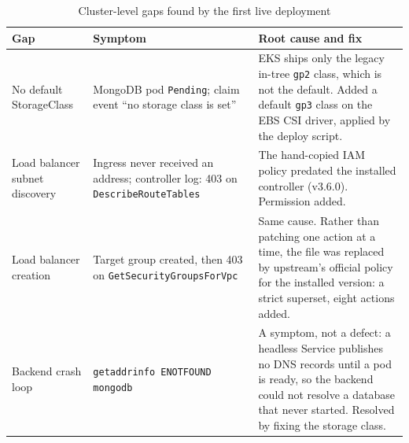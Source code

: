 \documentclass[11pt,a4paper]{article}
\begin{document}
\begin{table}[H]
\centering
\small
\begin{tabularx}{\textwidth}{@{}L{2.6cm} L{3.7cm} Y@{}}
\toprule
\textbf{Gap} & \textbf{Symptom} & \textbf{Root cause and fix} \\
\midrule
No default StorageClass & MongoDB pod \texttt{Pending}; claim event ``no
    storage class is set'' & EKS ships only the legacy in-tree \texttt{gp2}
    class, which is not the default. Added a default \texttt{gp3} class on the
    EBS CSI driver, applied by the deploy script. \\
Load balancer subnet discovery & Ingress never received an address; controller
    log: 403 on \texttt{DescribeRouteTables} & The hand-copied IAM policy
    predated the installed controller (v3.6.0). Permission added. \\
Load balancer creation & Target group created, then 403 on
    \texttt{GetSecurity\allowbreak GroupsForVpc} & Same cause. Rather than patching one
    action at a time, the file was replaced by upstream's official policy for
    the installed version: a strict superset, eight actions added. \\
Backend crash loop & \texttt{getaddrinfo ENOTFOUND mongodb} & A symptom, not a
    defect: a headless Service publishes no DNS records until a pod is ready,
    so the backend could not resolve a database that never started. Resolved
    by fixing the storage class. \\
\bottomrule
\end{tabularx}
\caption{Cluster-level gaps found by the first live deployment}
\label{tab:gaps}
\end{table}
\end{document}
